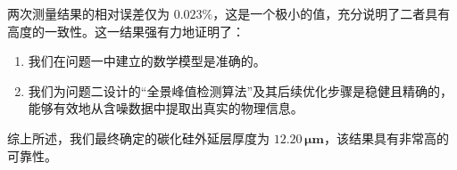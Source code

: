 \documentclass{ctexart} %
\begin{document}
两次测量结果的相对误差仅为 $0.023\%$，这是一个极小的值，充分说明了二者具有高度的一致性。这一结果强有力地证明了：
\begin{enumerate}
    \item 我们在问题一中建立的数学模型是准确的。
    \item 我们为问题二设计的“全景峰值检测算法”及其后续优化步骤是稳健且精确的，能够有效地从含噪数据中提取出真实的物理信息。
\end{enumerate}
综上所述，我们最终确定的碳化硅外延层厚度为 $\mathbf{12.20 \, \mu m}$，该结果具有非常高的可靠性。




\end{document}
